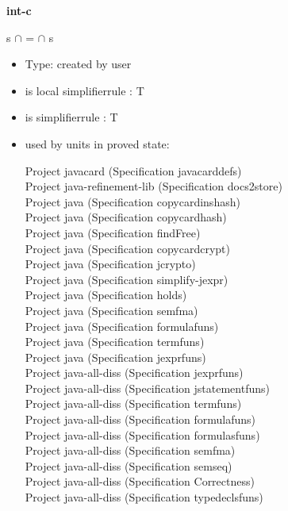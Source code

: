 \documentclass[a4paper]{article}
\begin{document}
{\LARGE\bf int-c}\label{lemma-int-c}

\medskip

 \Fol s $\cap$  =  $\cap$ s

\begin{itemize}

\item Type: created by user

\item is local simplifierrule : T
\item is simplifierrule : T
\item used by units in proved state:

Project javacard (Specification javacarddefs) \\
Project java-refinement-lib (Specification docs2store) \\
Project java (Specification copycardinshash) \\
Project java (Specification copycardhash) \\
Project java (Specification findFree) \\
Project java (Specification copycardcrypt) \\
Project java (Specification jcrypto) \\
Project java (Specification simplify-jexpr) \\
Project java (Specification holds) \\
Project java (Specification semfma) \\
Project java (Specification formulafuns) \\
Project java (Specification termfuns) \\
Project java (Specification jexprfuns) \\
Project java-all-diss (Specification jexprfuns) \\
Project java-all-diss (Specification jstatementfuns) \\
Project java-all-diss (Specification termfuns) \\
Project java-all-diss (Specification formulafuns) \\
Project java-all-diss (Specification formulasfuns) \\
Project java-all-diss (Specification semfma) \\
Project java-all-diss (Specification semseq) \\
Project java-all-diss (Specification Correctness) \\
Project java-all-diss (Specification typedeclsfuns) \\

\end{itemize}
\end{document}
